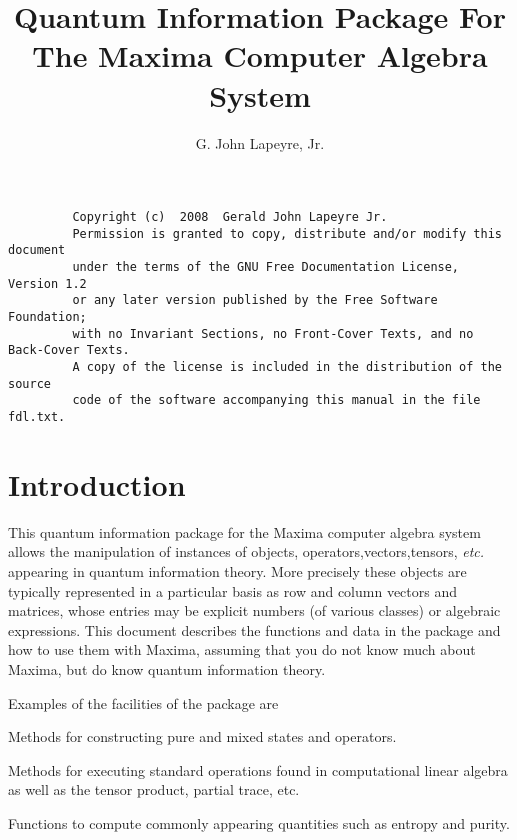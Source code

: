 \documentclass[leqno]{article}
\begin{document}
\title{Quantum Information Package For The Maxima Computer
  Algebra System}
\author{G. John Lapeyre, Jr.}

\maketitle

\begin{verbatim}
         Copyright (c)  2008  Gerald John Lapeyre Jr.
         Permission is granted to copy, distribute and/or modify this document
         under the terms of the GNU Free Documentation License, Version 1.2
         or any later version published by the Free Software Foundation;
         with no Invariant Sections, no Front-Cover Texts, and no Back-Cover Texts.
         A copy of the license is included in the distribution of the source
         code of the software accompanying this manual in the file fdl.txt.
\end{verbatim}

\section{Introduction}

This quantum information package for the Maxima computer
algebra system allows the manipulation of instances of objects,
operators,vectors,tensors, {\it etc.}  appearing in quantum
information theory.  More precisely these objects are
typically represented in a particular basis as row and column vectors
and matrices, whose entries may be explicit numbers (of
various classes) or algebraic expressions. This document
describes the functions and data in the package and how to
use them with Maxima, assuming that you do not know much
about Maxima, but do know quantum information theory.

Examples of the facilities of the
package are
\begin{itemize}
  \begin{item}
    Methods for constructing pure and mixed states and operators.
  \end{item}
  \begin{item}
    Methods for executing standard operations found in
    computational linear algebra as well as the tensor
    product, partial trace, etc.
  \end{item}
  \begin{item}
    Functions to compute commonly appearing quantities such as entropy and purity.
  \end{item}
\end{itemize}
\end{document}
